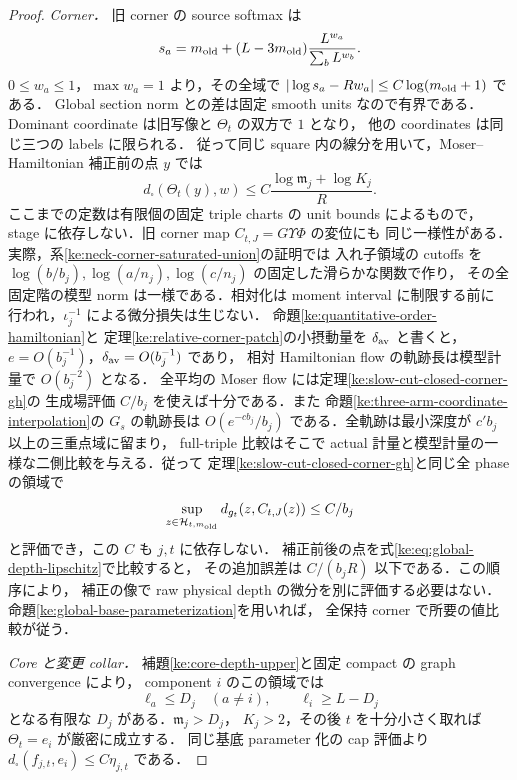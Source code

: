 \begin{proof}
\emph{Corner．}
旧 corner の source softmax は
\[
 s_a=m_{\rm old}+
     (L-3m_{\rm old})\frac{L^{w_a}}{\sum_bL^{w_b}}.
\]
$0\le w_a\le1$，$\max w_a=1$ より，その全域で
$|\log s_a-Rw_a|\le C\log(m_{\rm old}+1)$ である．
Global section norm との差は固定 smooth units なので有界である．
Dominant coordinate は旧写像と $\Theta_t$ の双方で $1$ となり，
他の coordinates は同じ三つの labels に限られる．
従って同じ square 内の線分を用いて，Moser--Hamiltonian 補正前の点 $y$ では
\[
 d_\square(\Theta_t(y),w)
 \le C\frac{\log\mathfrak m_j+\log K_j}R.
\]
ここまでの定数は有限個の固定 triple charts の unit bounds によるもので，
stage に依存しない．旧 corner map $C_{t,J}=G\Upsilon\Phi$ の変位にも
同じ一様性がある．実際，系\ref{ke:neck-corner-saturated-union}の証明では
入れ子領域の cutoffs を
$\log(b/b_j),\log(a/n_j),\log(c/n_j)$ の固定した滑らかな関数で作り，
その全固定階の模型 norm は一様である．相対化は moment interval に制限する前に
行われ，$\iota_j^{-1}$ による微分損失は生じない．
命題\ref{ke:quantitative-order-hamiltonian}と
定理\ref{ke:relative-corner-patch}の小摂動量を $\delta_{\rm av}$ と書くと，
$e=O(b_j^{-1})$，$\delta_{\rm av}=O(b_j^{-1})$ であり，
相対 Hamiltonian flow の軌跡長は模型計量で $O(b_j^{-2})$ となる．
全平均の Moser flow には定理\ref{ke:slow-cut-closed-corner-gh}の
生成場評価 $C/b_j$ を使えば十分である．また
命題\ref{ke:three-arm-coordinate-interpolation}の $G_s$ の軌跡長は
$O(e^{-cb_j}/b_j)$ である．全軌跡は最小深度が $c'b_j$ 以上の三重点域に留まり，
full-triple 比較はそこで actual 計量と模型計量の一様な二側比較を与える．従って
定理\ref{ke:slow-cut-closed-corner-gh}と同じ全 phase の領域で
\begin{equation}\label{ke:eq:corner-uniform-actual-displacement}
 \sup_{z\in\mathcal H_{t,m_{\rm old}}}
 d_{g_t}(z,C_{t,J}(z))\le C/b_j
\end{equation}
と評価でき，この $C$ も $j,t$ に依存しない．
補正前後の点を式\eqref{ke:eq:global-depth-lipschitz}で比較すると，
その追加誤差は $C/(b_jR)$ 以下である．この順序により，
補正の像で raw physical depth の微分を別に評価する必要はない．
命題\ref{ke:global-base-parameterization}を用いれば，
全保持 corner で所要の値比較が従う．

\emph{Core と変更 collar．}
補題\ref{ke:core-depth-upper}と固定 compact の graph convergence により，
component $i$ のこの領域では
\[
 \ell_a\le D_j\quad(a\ne i),\qquad \ell_i\ge L-D_j
\]
となる有限な $D_j$ がある．$\mathfrak m_j>D_j$，
$K_j>2$，その後 $t$ を十分小さく取れば $\Theta_t=e_i$ が厳密に成立する．
同じ基底 parameter 化の cap 評価より
$d_\square(f_{j,t},e_i)\le C\eta_{j,t}$ である．


\end{proof}
